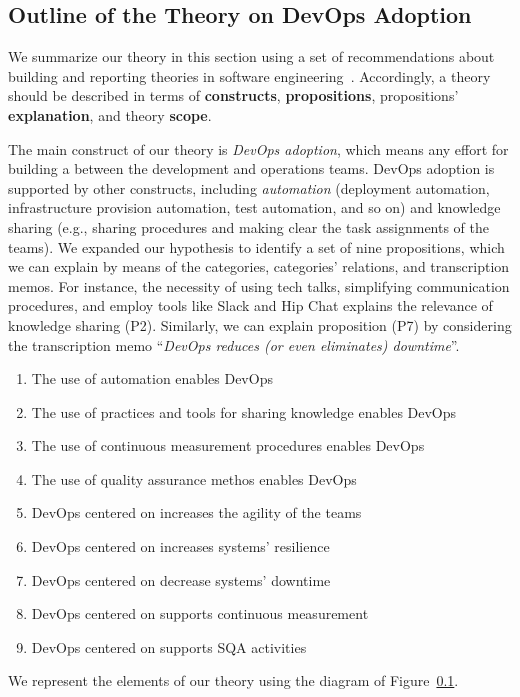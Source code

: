 \subsection{Outline of the Theory on DevOps Adoption}

We summarize our theory in this section using a 
set of recommendations about building and reporting
theories in software engineering~\cite{sjoberg2008}.
Accordingly, a theory should be described in
terms of {\bf constructs},
{\bf propositions}, propositions' {\bf explanation},
and theory {\bf scope}.

The main construct of our theory is \emph{DevOps adoption},
which means any effort for building a \cc between
the development and operations teams. DevOps adoption is
supported by other constructs, including \emph{automation}
(deployment automation, infrastructure provision automation,
test automation, and so on) and knowledge sharing (e.g.,
sharing procedures and making clear the task assignments
of the teams). We expanded our hypothesis to identify
a set of nine propositions, which we can explain
by means of the categories, categories' relations,
and transcription memos. For instance, the necessity of
using tech talks, simplifying communication procedures, and employ
tools like Slack and Hip Chat explains the relevance of knowledge sharing
(P2). Similarly, we can explain proposition (P7) by 
considering the transcription memo ``\emph{DevOps reduces (or even eliminates) downtime}''. 


\begin{enumerate}[(P1)]
 \item The use of automation enables DevOps
 \item The use of practices and tools for sharing knowledge enables DevOps
 \item The use of continuous measurement procedures enables DevOps
 \item The use of quality assurance methos enables DevOps
 \item DevOps centered on \cc increases the agility of the teams
 \item DevOps centered on \cc increases systems' resilience 
 \item DevOps centered on \cc decrease systems'  downtime
 \item DevOps centered on \cc supports continuous measurement 
 \item DevOps centered on \cc supports SQA activities   
\end{enumerate}

We represent the elements of our theory using the diagram
of Figure~\ref{}. 



